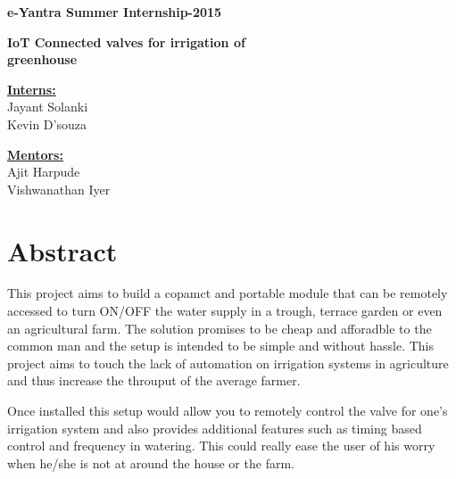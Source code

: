 \documentclass[16pt]{article}
\begin{document}
\begin{titlepage}
 
       

       \hfill\hfill\hfill

       {\LARGE{\textbf{e-Yantra Summer Internship-2015 \\ }}}
       
       \vspace{3cm}
       {\Large{\textbf{IoT Connected valves for irrigation of}}} \\  
      
       
        {\Large{\textbf{\hspace{3.2cm} greenhouse}}}
        
         \vspace{3cm}
        {\underline{\textbf{Interns:}}} \\
        
        Jayant Solanki \\
        
        Kevin D'souza  
        
        \vspace{1cm}
        
          {\underline{\textbf{Mentors:}}} \\
          
          Ajit Harpude \\
          
          Vishwanathan Iyer
          
\end{titlepage}
\tableofcontents
\vspace{15cm }

\section{Abstract}

 \vspace{0.5cm}
 This project aims to build a copamct and portable module that can be remotely accessed 
 to turn ON/OFF the water supply in a trough, terrace garden or even an agricultural farm. The solution promises to be cheap and afforadble to the common man and 
 the setup is intended to be simple and without hassle. This project aims to touch the lack of automation on irrigation systems in agriculture 
 and thus increase the throuput of the average farmer. 
 
 Once installed this setup would allow you to remotely control the valve for one's irrigation system and also provides additional features such as 
 timing based control and frequency in watering. This could really ease the user of his worry when he/she is not at around the house or the farm. 
 
\end{document}
